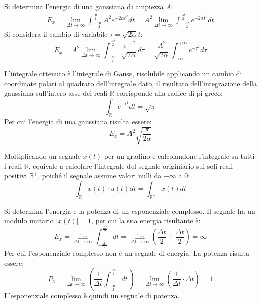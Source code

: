 \documentclass{article}
\numberwithin{equation}{subsection}
\begin{document}
Si determina l'energia di una gaussiana di ampiezza $A$:
\begin{gather*}
    E_x=\lim_{\Delta t\to\infty}\displaystyle\int_{-\frac{\Delta t}{2}}^{\frac{\Delta t}{2}}A^2e^{-2\alpha t^2}dt=A^2\lim_{\Delta t\to\infty}\displaystyle\int_{-\frac{\Delta t}{2}}^{\frac{\Delta t}{2}}e^{-2\alpha t^2}dt
\end{gather*}
Si considera il cambio di variabile $\tau=\sqrt{2\alpha}t$:
\begin{equation*}
    E_x=A^2\lim_{\Delta t\to\infty}\displaystyle\int_{-\frac{\Delta t}{2}}^{\frac{\Delta t}{2}}\frac{e^{-\tau^2}}{\sqrt{2\alpha}}d\tau=\frac{A^2}{\sqrt{2\alpha}}\int_{-\infty}^{+\infty}e^{-\tau^2}d\tau
\end{equation*}

L'integrale ottenuto è l'integrale di Gauss, risolubile applicando un cambio di coordinate polari al quadrato dell'integrale dato, il risultato dell'integrazione della 
gaussiana sull'intero asse dei reali $\mathbb{R}$ corrisponde alla radice di pi greco: 
\begin{equation*}
    \displaystyle\int_{\mathbb{R}}e^{-t^2}dt=\sqrt\pi
\end{equation*}
Per cui l'energia di una gaussiana risulta essere:
\begin{equation}
    E_x=A^2\displaystyle\sqrt{\frac{\pi}{2\alpha}}
\end{equation}




Moltiplicando un segnale $x(t)$ per un gradino e calcolandone l'integrale su tutti i reali $\mathbb{R}$, equivale a calcolare l'integrale del segnale originiario sui soli 
reali positivi $\mathbb{R}^+$, poiché il segnale assume valori nulli da $-\infty$ a $0$: 
\begin{equation*}
    \displaystyle\int_{\mathbb{R}}x(t)\cdot u(t)dt=\int_{\mathbb{R}^+}x(t)dt
\end{equation*}



Si determina l'energia e la potenza di un esponenziale complesso. Il segnale ha un modulo unitario $|x(t)|=1$, per cui la sua energia risultante è:
\begin{equation*}
    E_x=\lim_{\Delta t\to\infty}\displaystyle\int_{-\frac{\Delta t}{2}}^{\frac{\Delta t}{2}}dt=\lim_{\Delta t\to\infty}\left(\frac{\Delta t}{2}+\frac{\Delta t}{2}\right)=\infty
\end{equation*}
Per cui l'esponenziale complesso non è un segnale di energia. La potenza risulta essere:
\begin{equation*}
    P_x=\lim_{\Delta t\to\infty}\displaystyle\left(\frac{1}{\Delta t}\int_{-\frac{\Delta t}{2}}^{\frac{\Delta t}{2}}dt\right)=\lim_{\Delta t\to\infty}\left(\frac{1}{\Delta t}\cdot\Delta t\right)=1
\end{equation*}
L'esponenziale complesso è quindi un segnale di potenza. 
\end{document}
